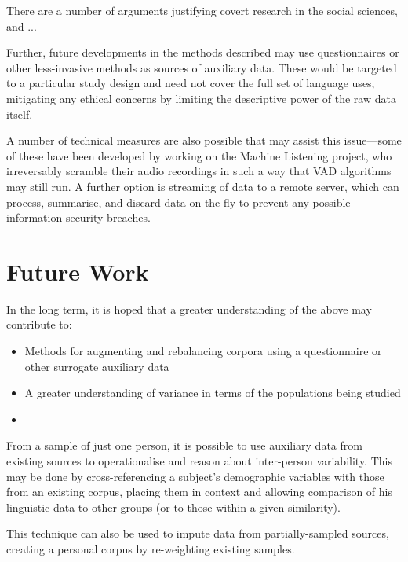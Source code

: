 There are a number of arguments justifying covert research in the social sciences, and ...




Further, future developments in the methods described may use questionnaires or other less-invasive methods as sources of auxiliary data.  These would be targeted to a particular study design and need not cover the full set of language uses, mitigating any ethical concerns by limiting the descriptive power of the raw data itself.

A number of technical measures are also possible that may assist this issue---some of these have been developed by  working on the Machine Listening project, who irreversably scramble their audio recordings in such a way that VAD algorithms may still run.  A further option is streaming of data to a remote server, which can process, summarise, and discard data on-the-fly to prevent any possible information security breaches.








\section{Future Work}

In the long term, it is hoped that a greater understanding of the above may contribute to:

\begin{itemize}
    \item Methods for augmenting and rebalancing corpora using a questionnaire or other surrogate auxiliary data
    \item A greater understanding of variance in terms of the populations being studied
    \item 
\end{itemize}

From a sample of just one person, it is possible to use auxiliary data from existing sources to operationalise and reason about inter-person variability.  This may be done by cross-referencing a subject's demographic variables with those from an existing corpus, placing them in context and allowing comparison of his linguistic data to other groups (or to those within a given similarity).

This technique can also be used to impute data from partially-sampled sources, creating a personal corpus by re-weighting existing samples.

